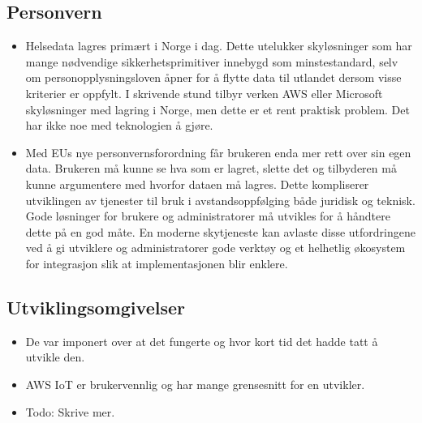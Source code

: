 \subsection{Personvern}
\begin{itemize}
  \item Helsedata lagres primært i Norge i dag. Dette utelukker skyløsninger
  som har mange nødvendige sikkerhetsprimitiver innebygd som minstestandard, selv
  om personopplysningsloven åpner for å flytte data til utlandet dersom visse kriterier er oppfylt.
  I skrivende stund tilbyr verken AWS eller Microsoft skyløsninger med lagring i Norge, men dette er et rent
  praktisk problem. Det har ikke noe med teknologien å gjøre.
  \item Med EUs nye personvernsforordning får brukeren enda mer rett over sin egen data.
  Brukeren må kunne se hva som er lagret, slette det og tilbyderen må kunne argumentere
  med hvorfor dataen må lagres. Dette kompliserer utviklingen av tjenester til bruk i avstandsoppfølging
  både juridisk og teknisk. Gode løsninger for brukere og administratorer må utvikles for å håndtere dette
  på en god måte. En moderne skytjeneste kan avlaste disse utfordringene ved å gi utviklere og administratorer
  gode verktøy og et helhetlig økosystem for integrasjon slik at implementasjonen blir enklere.
\end{itemize}

\subsection{Utviklingsomgivelser}
\begin{itemize}
    \item De var imponert over
        at det fungerte og hvor kort tid det hadde tatt å utvikle den.
    \item AWS IoT er brukervennlig og har mange grensesnitt for en utvikler.
    \item Todo: Skrive mer.
\end{itemize}

\iffalse
\item Brukere og helsepersonell i avstandsoppfølging fortjener gode og bra utformet løsninger. Det er fortsatt en jobb
        å gjøre på det området. Helsepersonell savner å kunne se grafer av måledata over tid, og kan derfor ikke få så god
        nytte av dataen per i dag. Her må leverandørene jobbe tett sammen med interesseholderne for å møte behovene.
\item Leverandøren av tekniske løsninger må sette seg inn i teknologien som brukes for å gi brukeren en best mulig opplevelse.
        Det gjelder for eksempel å indikere at en måling er ferdig på skjermen til sensoren.
    \item Brukerne sier, i følge Trondheim kommune, at de synes HelsaMi+ er enkelt å bruke.
\fi

